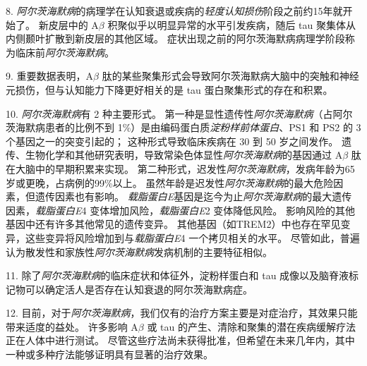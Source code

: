 8. \textit{阿尔茨海默病}的病理学在认知衰退或疾病的\textit{轻度认知损伤}阶段之前约15年就开始了。
新皮层中的 A$\beta$ 积聚似乎以明显异常的水平引发疾病，随后 tau 聚集体从内侧颞叶扩散到新皮层的其他区域。
症状出现之前的阿尔茨海默病病理学阶段称为临床前\textit{阿尔茨海默病}。


9. 重要数据表明，A$\beta$ 肽的某些聚集形式会导致阿尔茨海默病大脑中的突触和神经元损伤，但与认知能力下降更好相关的是 tau 蛋白聚集形式的存在和积累。


10. \textit{阿尔茨海默病}有 2 种主要形式。
第一种是显性遗传性\textit{阿尔茨海默病}（占阿尔茨海默病患者的比例不到 1\%）是由编码蛋白质\textit{淀粉样前体蛋白}、PS1 和 PS2 的 3 个基因之一的突变引起的；
这种形式导致临床疾病在 30 到 50 岁之间发作。
遗传、生物化学和其他研究表明，导致常染色体显性\textit{阿尔茨海默病}的基因通过 A$\beta$ 肽在大脑中的早期积累来实现。
第二种形式，迟发性\textit{阿尔茨海默病}，发病年龄为65岁或更晚，占病例的99\%以上。
虽然年龄是迟发性\textit{阿尔茨海默病}的最大危险因素，但遗传因素也有影响。
\textit{载脂蛋白E}基因是迄今为止\textit{阿尔茨海默病}的最大遗传因素，\textit{载脂蛋白E}4 变体增加风险，\textit{载脂蛋白E}2 变体降低风险。
影响风险的其他基因中还有许多其他常见的遗传变异。
其他基因（如TREM2）中也存在罕见变异，这些变异将风险增加到与\textit{载脂蛋白E}4 一个拷贝相关的水平。
尽管如此，普遍认为散发性和家族性\textit{阿尔茨海默病}发病机制的主要特征相似。


11. 除了\textit{阿尔茨海默病}的临床症状和体征外，淀粉样蛋白和 tau 成像以及脑脊液标记物可以确定活人是否存在认知衰退的阿尔茨海默病症。


12. 目前，对于\textit{阿尔茨海默病}，我们仅有的治疗方案主要是对症治疗，其效果只能带来适度的益处。
许多影响 A$\beta$ 或 tau 的产生、清除和聚集的潜在疾病缓解疗法正在人体中进行测试。
尽管这些疗法尚未获得批准，但希望在未来几年内，其中一种或多种疗法能够证明具有显著的治疗效果。


